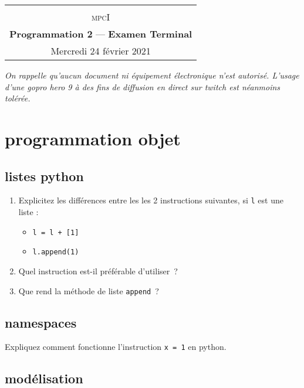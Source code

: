 \documentclass
[12pt]
{article}
\begin{document}
\begin{center}
  \begin{tabular}{c}
  \hline\\%
  {\textsc{mpc\large{I}}}\vspace{0.1cm}
  \\
%  
    {\bf {\Large Programmation 2}} — {\bf  { Examen Terminal}}\\
    {\footnotesize Mercredi 24 février 2021}\\
    \hline
  \end{tabular}
\end{center}
\vspace{0.6cm}
%
%
\begin{center}
{\em On rappelle qu'aucun document ni équipement électronique n'est autorisé. L'usage d'une gopro hero 9 à des fins de diffusion en direct sur twitch est néanmoins tolérée. }
\end{center}
\section{programmation objet}

\subsection{listes python}

\begin{enumerate}
  \item
Explicitez les différences entre les les 2 instructions suivantes, si {\tt l} est une liste :
\begin{itemize}
  \item {\tt l = l + [1]}
  \item {\tt l.append(1)}
\end{itemize}
\item Quel instruction est-il préférable  d'utiliser~? 
\item Que rend la méthode de liste {\tt append}~?
\end{enumerate}

\subsection{namespaces}
Expliquez comment fonctionne l'instruction {\tt x = 1} en python.

\subsection{modélisation}
\end{document}
